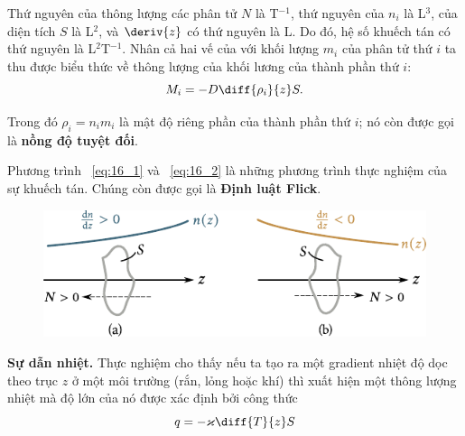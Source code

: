 Thứ nguyên của thông lượng các phân tử $N$ là T$^{-1}$, thứ nguyên của $n_i$ là L$^{3}$, của diện tích $S$ là L$^{2}$, và $\deriv{z}$ có thứ nguyên là L. Do đó, hệ số khuếch tán có thứ nguyên là L$^2$T$^{-1}$. Nhân cả hai vế của  với khối lượng $m_i$ của phân tử thứ $i$ ta thu được biểu thức về thông lượng của khối lương của thành phần thứ $i$:
\begin{equation}\label{eq:16_2}
    M_i = -D \diff{\rho_i}{z} S.
\end{equation}

\noindent
Trong đó $\rho_i=n_im_i$ là mật độ riêng phần của thành phần thứ $i$; nó còn được gọi là \textbf{nồng độ tuyệt đối}.

Phương trình ~\eqref{eq:16_1} và ~\eqref{eq:16_2} là những phương trình thực nghiệm của sự khuếch tán. Chúng còn được gọi là \textbf{Định luật Flick}.

\begin{figure}[!htb]
	\begin{center}
		\includegraphics[scale=1]{figures/ch_16/fig_16_2.pdf}
		\caption[]{}
		\label{fig:16_2}
	\end{center}
\end{figure}

\textbf{Sự dẫn nhiệt.} Thực nghiệm cho thấy nếu ta tạo ra một gradient nhiệt độ dọc theo trục $z$ ở một môi trường (rắn, lỏng hoặc khí) thì xuất hiện một thông lượng nhiệt mà độ lớn của nó được xác định bởi công thức
\begin{equation}\label{eq:16_3}
    q = -\varkappa \diff{T}{z} S
\end{equation}


